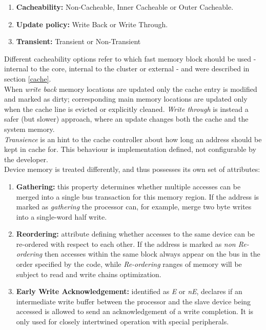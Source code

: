 \documentclass[12pt,a4paper,openright,twoside]{report}
\begin{document}
\begin{enumerate}
    \item \textbf{Cacheability:} Non-Cacheable, Inner Cacheable or Outer Cacheable.
    \item \textbf{Update policy:} Write Back or Write Through.
    \item \textbf{Transient:} Transient or Non-Transient
\end{enumerate}

Different cacheability options refer to which fast memory block should be used
- internal to the core, internal to the cluster or external - and were described
 in section \ref{cache}.\\
When \textit{write back} memory locations are updated only the  cache entry
is modified and marked as dirty; corresponding main memory locations are updated 
only when the cache line is evicted or explicitly cleaned.
\textit{Write through} is instead a safer (but slower) approach, where an update 
changes both the cache and the system memory.\\
\textit{Transience} is an hint to the cache controller about how long an address should be 
kept in cache for. This behaviour is implementation defined, not configurable
by the developer.\\

Device memory is treated differently, and thus possesses its own set of attributes:
\begin{enumerate}
    \item \textbf{Gathering:} this property determines whether multiple accesses
        can be merged into a single bus transaction for this memory region. If 
        the address is marked as \textit{gathering} the processor can, for example, 
        merge two byte writes into a single-word half write.
    \item \textbf{Reordering:} attribute defining whether accesses to the same 
        device can be re-ordered with respect to each other. If the address is 
        marked as \textit{non Re-ordering} then accesses within the same block 
        always appear on the bus in the order specified by the code, while
        \textit{Re-ordering} ranges of memory will be subject to read and write
        chains optimization.
    \item \textbf{Early Write Acknowledgement:} identified as \textit{E} 
        or \textit{nE}, declares if an 
        intermediate write buffer between the processor and
        the slave device being accessed is allowed to send an 
        acknowledgement of a write completion. It is only used for closely 
        intertwined operation with special peripherals.
\end{enumerate}
\end{document}
